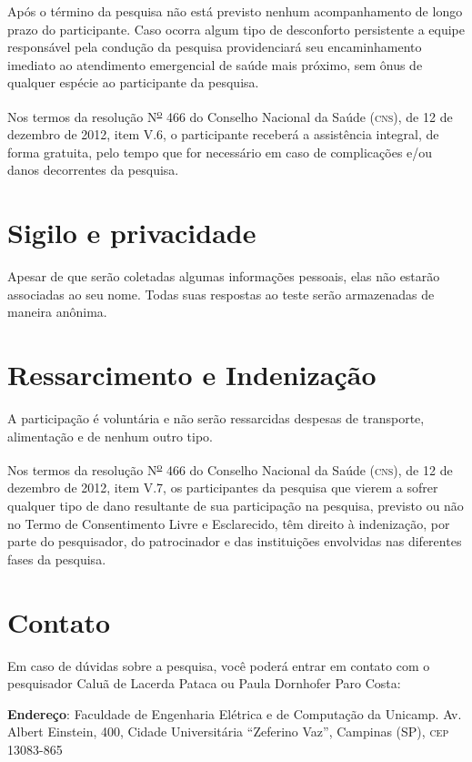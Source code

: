 \documentclass[a4paper,11pt,titlepage,singlespacing]{article}
\begin{document}
\noindent Após o término da pesquisa não está previsto nenhum acompanhamento de longo prazo do participante. Caso ocorra algum tipo de desconforto persistente a equipe responsável pela condução da pesquisa providenciará seu encaminhamento imediato ao atendimento emergencial de saúde mais próximo, sem ônus de qualquer espécie ao participante da pesquisa.

Nos termos da resolução N\textsuperscript{\underline{o}} 466 do Conselho Nacional da Saúde (\textsc{cns}), de 12 de dezembro de 2012, item V.6, o participante receberá a assistência integral, de forma gratuita, pelo tempo que for necessário em caso de complicações e/ou danos decorrentes da pesquisa.


\section*{Sigilo e privacidade}

\noindent Apesar de que serão coletadas algumas informações pessoais, elas não estarão associadas ao seu nome. Todas suas respostas ao teste serão armazenadas de maneira anônima.

\section*{Ressarcimento e Indenização}

\noindent A participação é voluntária e não serão ressarcidas despesas de transporte, alimentação e de nenhum outro tipo.

Nos termos da resolução N\textsuperscript{\underline{o}} 466 do Conselho Nacional da Saúde (\textsc{cns}), de 12 de dezembro de 2012, item V.7, os participantes da pesquisa que vierem a sofrer qualquer tipo de dano resultante de sua participação na pesquisa, previsto ou não no Termo de Consentimento Livre e Esclarecido, têm direito à indenização, por parte do pesquisador, do patrocinador e das instituições envolvidas nas diferentes fases da pesquisa.

\section*{Contato}

\noindent Em caso de dúvidas sobre a pesquisa, você poderá entrar em contato com o pesquisador Caluã de Lacerda Pataca ou Paula Dornhofer Paro Costa:

\noindent \textbf{Endereço}: Faculdade de Engenharia Elétrica e de Computação da Unicamp. Av. Albert Einstein, 400, Cidade Universitária “Zeferino Vaz”, Campinas (SP), \textsc{cep}
13083-865
\end{document}
